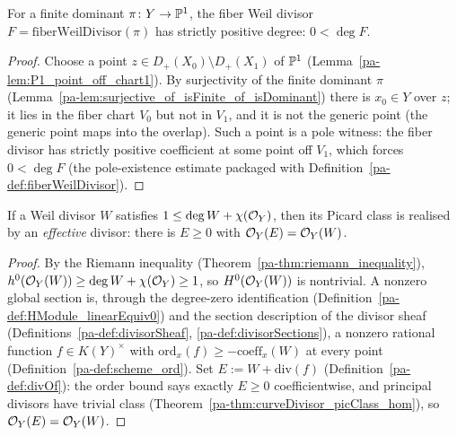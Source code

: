\begin{theorem}
  \label{pa-thm:zero_lt_deg_fiberWeilDivisor}
  \leanok

  For a finite dominant \(\pi \colon Y \to \mathbb{P}^1\), the fiber Weil divisor
  \(F = \mathrm{fiberWeilDivisor}(\pi)\) has strictly positive degree: \(0 < \deg F\).
\end{theorem}
\begin{proof}
  \leanok
  Choose a point \(z \in D_+(X_0) \setminus D_+(X_1)\) of \(\mathbb{P}^1\)
  (Lemma~\ref{pa-lem:P1_point_off_chart1}). By surjectivity of the finite dominant \(\pi\)
  (Lemma~\ref{pa-lem:surjective_of_isFinite_of_isDominant}) there is \(x_0 \in Y\) over \(z\);
  it lies in the fiber chart \(V_0\) but not in \(V_1\), and it is not the generic point
  (the generic point maps into the overlap). Such a point is a pole witness: the fiber
  divisor has strictly positive coefficient at some point off \(V_1\), which forces
  \(0 < \deg F\) (the pole-existence estimate packaged with
  Definition~\ref{pa-def:fiberWeilDivisor}).
\end{proof}

\begin{lemma}
  \label{pa-lem:exists_effective_of_picClass}
  \leanok

  If a Weil divisor \(W\) satisfies \(1 \le \deg W + \chi(\mathcal{O}_{Y})\), then its Picard
  class is realised by an \emph{effective} divisor: there is \(E \ge 0\) with
  \(\mathcal{O}_{Y}(E) = \mathcal{O}_{Y}(W)\).
\end{lemma}
\begin{proof}
  \leanok
  By the Riemann inequality (Theorem~\ref{pa-thm:riemann_inequality}),
  \(h^0(\mathcal{O}_{Y}(W)) \ge \deg W + \chi(\mathcal{O}_{Y}) \ge 1\), so \(H^0(\mathcal{O}_{Y}(W))\) is
  nontrivial. A nonzero global section is, through the degree-zero identification
  (Definition~\ref{pa-def:HModule_linearEquiv0}) and the section description of the divisor
  sheaf (Definitions~\ref{pa-def:divisorSheaf}, \ref{pa-def:divisorSections}), a nonzero rational
  function \(f \in K(Y)^{\times}\) with \(\mathrm{ord}_x(f) \ge -\mathrm{coeff}_x(W)\) at
  every point (Definition~\ref{pa-def:scheme_ord}). Set \(E := W + \mathrm{div}(f)\)
  (Definition~\ref{pa-def:divOf}): the order bound says exactly \(E \ge 0\) coefficientwise,
  and principal divisors have trivial class
  (Theorem~\ref{pa-thm:curveDivisor_picClass_hom}), so \(\mathcal{O}_{Y}(E) = \mathcal{O}_{Y}(W)\).
\end{proof}

